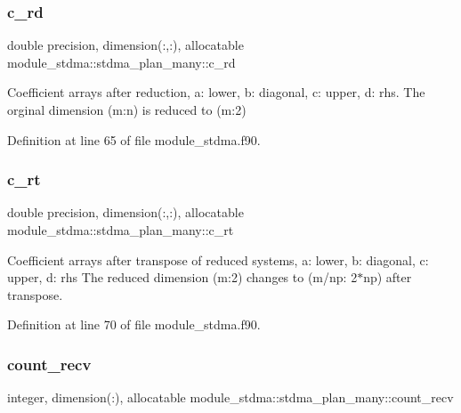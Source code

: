 \subsubsection{\texorpdfstring{c\_rd}{c\_rd}}
{\footnotesize\ttfamily double precision, dimension(\+:,\+:), allocatable module\+\_\+stdma\+::stdma\+\_\+plan\+\_\+many\+::c\+\_\+rd}



Coefficient arrays after reduction, a\+: lower, b\+: diagonal, c\+: upper, d\+: rhs. The orginal dimension (m\+:n) is reduced to (m\+:2) 



Definition at line 65 of file module\+\_\+stdma.\+f90.

\mbox{\label{structmodule__stdma_1_1stdma__plan__many_ac47b44d0b8f2675b7dceff9570f2953b}} 
\subsubsection{\texorpdfstring{c\_rt}{c\_rt}}
{\footnotesize\ttfamily double precision, dimension(\+:,\+:), allocatable module\+\_\+stdma\+::stdma\+\_\+plan\+\_\+many\+::c\+\_\+rt}



Coefficient arrays after transpose of reduced systems, a\+: lower, b\+: diagonal, c\+: upper, d\+: rhs The reduced dimension (m\+:2) changes to (m/np\+: 2$\ast$np) after transpose. 



Definition at line 70 of file module\+\_\+stdma.\+f90.

\mbox{\label{structmodule__stdma_1_1stdma__plan__many_a572723c149990425e6109dc8614bacb4}} 
\subsubsection{\texorpdfstring{count\_recv}{count\_recv}}
{\footnotesize\ttfamily integer, dimension(\+:), allocatable module\+\_\+stdma\+::stdma\+\_\+plan\+\_\+many\+::count\+\_\+recv}



